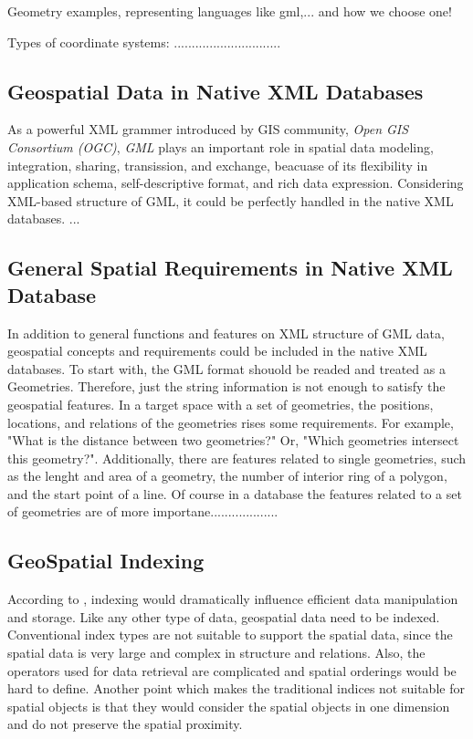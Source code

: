 \documentclass[a4paper,12pt]{article}
\begin{document}
Geometry examples,
representing languages like gml,... and how we choose one!

Types of coordinate systems:
..............................


\subsection{Geospatial Data in Native XML Databases}
As a powerful XML grammer introduced by GIS community, \textit{Open GIS Consortium (OGC)}, \textit{GML} plays an important role in spatial data modeling, integration, sharing, transission, and exchange, beacuase of its flexibility in application schema, self-descriptive format, and rich data expression. Considering XML-based structure of GML, it could be perfectly handled in the native XML databases. ...

\subsection{General Spatial Requirements in Native XML Database}
In addition to general functions and features on XML structure of GML data, geospatial concepts and requirements could be included in the native XML databases. To start with, the GML format shouold be readed and treated as a Geometries. Therefore, just the string information is not enough to satisfy the geospatial features. In a target space with a set of geometries, the positions, locations, and relations of the geometries rises some requirements. For example, "What is the distance between two geometries?" Or, "Which geometries intersect this geometry?". Additionally, there are features related to single geometries, such as the lenght and area of a geometry, the number of interior ring of a polygon, and the start point of a line. Of course in a database the features related to a set of geometries are of more importane...................

\subsection{GeoSpatial Indexing}
According to \cite{survey}, indexing would dramatically influence efficient data manipulation and storage. Like any other type of data, geospatial data need to be indexed. Conventional index types are not suitable to support the spatial data, since the spatial data is very large and complex in structure and relations. Also, the operators used for data retrieval are complicated and spatial orderings would be hard to define. Another point which makes the traditional indices not suitable for spatial objects is that they would consider the spatial objects in one dimension and do not preserve the spatial proximity.
\end{document}
